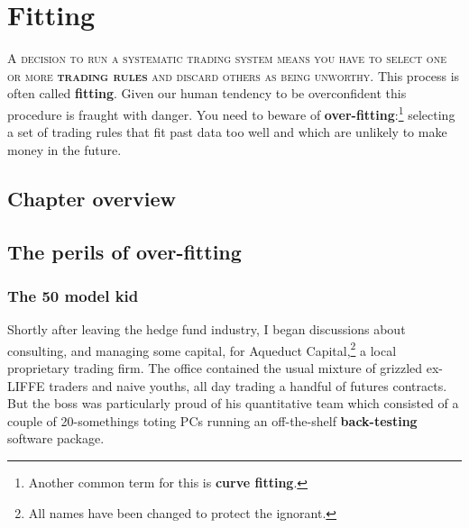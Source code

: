 \chapter{Fitting}


\noindent\textsc{A decision to run a systematic trading system means you have to select one or more \textbf{trading rules} and discard others as being unworthy.} This process is often called \textbf{fitting}. Given our human tendency to be overconfident this procedure is fraught with danger. You need to beware of \textbf{over-fitting}:\footnote{Another common term for this is \textbf{curve fitting}.} selecting a set of trading rules that fit past data too well and which are unlikely to make money in the future.

\section*{Chapter overview}  {}

\begin{chapteroverviewtable}
\end{chapteroverviewtable}

\section*{The perils of over-fitting}  {}

\subsection*{The 50 model kid}

Shortly after leaving the hedge fund industry, I began discussions about consulting, and managing some capital, for Aqueduct Capital,\footnote{All names have been changed to protect the ignorant.} a local proprietary trading firm. The office contained the usual mixture of grizzled ex-LIFFE traders and naive youths, all day trading a handful of futures contracts. But the boss was particularly proud of his quantitative team which consisted of a couple of 20-somethings toting PCs running an off-the-shelf \textbf{back-testing} software package.

